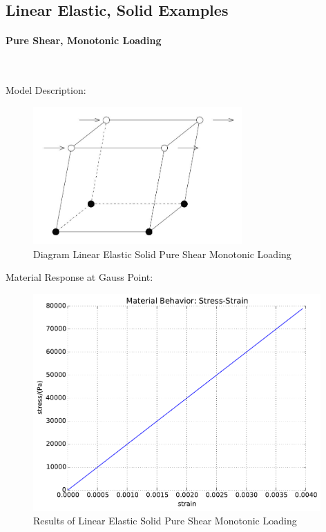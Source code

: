\documentclass[fleqn,11pt]{article}
\begin{document}
\subsection{Linear Elastic, Solid Examples}

\paragraph{Pure Shear, Monotonic Loading} ~

Model Description:

\begin{figure}[H]
\begin{center}
\includegraphics[width=8cm]{../Figure-files/shear_brick.JPG}
\caption{
\label{Diagram_Linear Elastic Pure Shear Monotonic Loadin}
Diagram Linear Elastic Solid Pure Shear Monotonic Loading}
\end{center}
\end{figure}

Material Response at Gauss Point:
\begin{figure}[H]
\begin{center}
\includegraphics[width=11cm]{../fei_examples/linear_elastic_solid/1pure_shear_mono_loading/result.pdf}
\caption{
\label{Linear Elastic_solid Pure Shear Monotonic Loadin}
Results of Linear Elastic Solid Pure Shear Monotonic Loading}
\end{center}
\end{figure}
\end{document}
